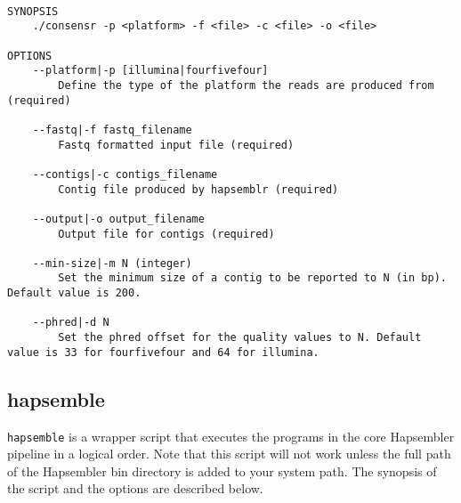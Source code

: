 \documentclass[12pt,a4paper]{report}
\begin{document}
\begin{lstlisting}

SYNOPSIS
    ./consensr -p <platform> -f <file> -c <file> -o <file> 

OPTIONS 
    --platform|-p [illumina|fourfivefour] 
        Define the type of the platform the reads are produced from (required) 

    --fastq|-f fastq_filename 
        Fastq formatted input file (required) 

    --contigs|-c contigs_filename 
        Contig file produced by hapsemblr (required) 

    --output|-o output_filename 
        Output file for contigs (required) 

    --min-size|-m N (integer) 
        Set the minimum size of a contig to be reported to N (in bp). Default value is 200. 

    --phred|-d N 
        Set the phred offset for the quality values to N. Default value is 33 for fourfivefour and 64 for illumina. 

\end{lstlisting}

\subsection{hapsemble}

\texttt{hapsemble} is a wrapper script that executes the programs in the core Hapsembler pipeline in a logical order. Note that this script will not work unless the full path of the Hapsembler bin directory is added to your system path. The synopsis of the script and the options are described below.
\end{document}
